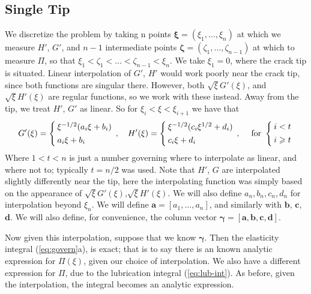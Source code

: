 \documentclass{jfm}
\begin{document}
\subsection{Single Tip}
We discretize the problem by taking n points $\boldsymbol{\xi} = (\xi_1, \dots
,\xi_n)$ at which we measure $H'$, $G'$, and $n-1$ intermediate points 
$\boldsymbol{\zeta} = (\zeta_1, \dots , \zeta_{n-1})$ at which to measure
$\Pi$, so that $\xi_1 < \zeta_1 < \dots < \zeta_{n-1} < \xi_n$. We take
$\xi_1 = 0$, where the crack tip is situated.
Linear interpolation of $G'$, $H'$ would work poorly near the crack tip, since
both functions are singular there. However, both $\sqrt{\xi}G'(\xi)$, and
$\sqrt{\xi}H'(\xi)$ are regular functions, so we work with these instead.
Away from the tip, we treat $H'$, $G'$ as linear. So for 
$\xi_{i} < \xi < \xi_{i+1}$ we have that
\begin{equation}
\setlength{\arraycolsep}{2pt}
G'(\xi) = \left\{ \begin{array}{l}  
\xi^{-1/2}(a_i \xi + b_i) \\[4pt]
a_i \xi + b_i
 \end{array}\right., \quad
H'(\xi) = \left\{ \begin{array}{l}  
\xi^{-1/2}(c_i \xi^{1/2} + d_i) \\[4pt]
c_i \xi + d_i
 \end{array}\right. , \quad
\; \mbox{for\ } \left\{ \begin{array}{l}  
i<t\\[4pt]
i\geq t
\end{array}\right.
\end{equation}
Where $1 < t < n$ is just a number governing where to interpolate as linear, and
where not to; typically $t = n/2$ was used. Note that $H'$, $G$ are interpolated
slightly differently near the tip, here the interpolating function was simply 
based on the appearance of $\sqrt{\xi}G'(\xi)$,$\sqrt{\xi}H'(\xi)$.
We will also define $a_n,b_n,c_n,d_n$ for interpolation beyond $\xi_n$.
We will define $\boldsymbol{a} = [a_1,\dots ,a_n]$, and similarly with 
$\boldsymbol{b}$, $\boldsymbol{c}$, $\boldsymbol{d}$. We will also define,
for convenience, the column vector $\boldsymbol{\gamma}=[\boldsymbol{a},
\boldsymbol{b},\boldsymbol{c},\boldsymbol{d}]$.

Now given this interpolation, suppose that we know $\boldsymbol{\gamma}$.
Then the elasticity integral (\ref{eq:govern}a), is exact; 
that is to say there is an known analytic expression for $\Pi(\xi)$, given 
our choice of interpolation.
We also have a different expression for $\Pi$, due to the lubrication integral
(\ref{eq:lub-int}).
As before, given the interpolation, the integral becomes an analytic
expression.
\end{document}
